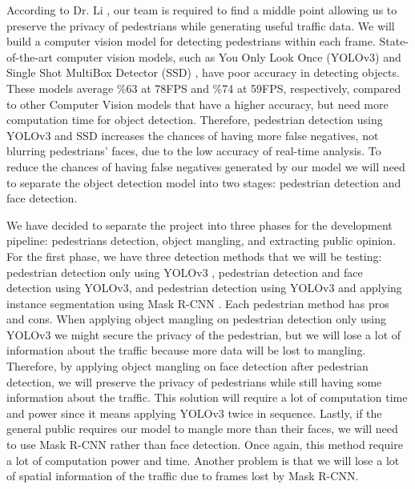 According to Dr. Li \cite{li}, our team is required to find a middle point allowing us to preserve the privacy of pedestrians while generating useful traffic data. We will build a computer vision model for detecting pedestrians within each frame. State-of-the-art computer vision models, such as You Only Look Once (YOLOv3) \cite{YOLOv3} and Single Shot MultiBox Detector (SSD) \cite{SSD}, have poor accuracy in detecting objects. These models average \%63 at 78FPS and \%74 at 59FPS, respectively, compared to other Computer Vision models that have a higher accuracy, but need more computation time for object detection. Therefore, pedestrian detection using YOLOv3 and SSD increases the chances of having more false negatives, not blurring pedestrians' faces, due to the low accuracy of real-time analysis. To reduce the chances of having false negatives generated by our model we will need to separate the object detection model into two stages: pedestrian detection and face detection.

We have decided to separate the project into three phases for the development pipeline: pedestrians detection, object mangling, and extracting public opinion. For the first phase, we have three detection methods that we will be testing: pedestrian detection only using YOLOv3 \cite{YOLOv3}, pedestrian detection and face detection using YOLOv3, and pedestrian detection using YOLOv3 and applying instance segmentation using Mask R-CNN \cite{maskrcnn}. Each pedestrian method has pros and cons. When applying object mangling on pedestrian detection only using YOLOv3 we might secure the privacy of the pedestrian, but we will lose a lot of information about the traffic because more data will be lost to mangling. Therefore, by applying object mangling on face detection after pedestrian detection, we will preserve the privacy of pedestrians while still having some information about the traffic. This solution will require a lot of computation time and power since it means applying YOLOv3 twice in sequence. Lastly, if the general public requires our model to mangle more than their faces, we will need to use Mask R-CNN rather than face detection. Once again, this method require a lot of computation power and time. Another problem is that we will lose a lot of spatial information of the traffic due to frames lost by Mask R-CNN.


